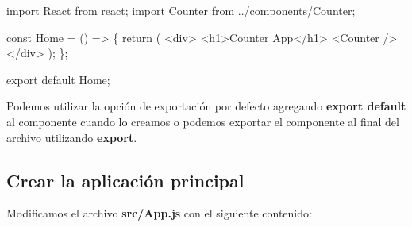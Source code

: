 \documentclass[
  a4paper,
  DIV=11,
  numbers=noendperiod,
  onepage,
  openany]{scrreprt}
\newenvironment{Shaded}{\begin{snugshade}}{\end{snugshade}}
\newcommand{\ControlFlowTok}[1]{\textcolor[rgb]{0.00,0.23,0.31}{#1}}
\newcommand{\FunctionTok}[1]{\textcolor[rgb]{0.28,0.35,0.67}{#1}}
\newcommand{\ImportTok}[1]{\textcolor[rgb]{0.00,0.46,0.62}{#1}}
\newcommand{\KeywordTok}[1]{\textcolor[rgb]{0.00,0.23,0.31}{#1}}
\newcommand{\NormalTok}[1]{\textcolor[rgb]{0.00,0.23,0.31}{#1}}
\newcommand{\OperatorTok}[1]{\textcolor[rgb]{0.37,0.37,0.37}{#1}}
\newcommand{\StringTok}[1]{\textcolor[rgb]{0.13,0.47,0.30}{#1}}
\begin{document}
\begin{Shaded}
\begin{Highlighting}[]
\ImportTok{import}\NormalTok{ React }\ImportTok{from} \StringTok{\textquotesingle{}react\textquotesingle{}}\OperatorTok{;}
\ImportTok{import}\NormalTok{ Counter }\ImportTok{from} \StringTok{\textquotesingle{}../components/Counter\textquotesingle{}}\OperatorTok{;}

\KeywordTok{const}\NormalTok{ Home }\OperatorTok{=}\NormalTok{ () }\KeywordTok{=\textgreater{}}\NormalTok{ \{}
  \ControlFlowTok{return}\NormalTok{ (}
    \KeywordTok{\textless{}div\textgreater{}}
      \KeywordTok{\textless{}h1\textgreater{}}\NormalTok{Counter App}\KeywordTok{\textless{}/h1\textgreater{}}
      \FunctionTok{\textless{}Counter} \FunctionTok{/\textgreater{}}
    \KeywordTok{\textless{}/div\textgreater{}}
\NormalTok{  )}\OperatorTok{;}
\NormalTok{\}}\OperatorTok{;}

\ImportTok{export} \ImportTok{default}\NormalTok{ Home}\OperatorTok{;}
\end{Highlighting}
\end{Shaded}

\begin{tcolorbox}[enhanced jigsaw, title=\textcolor{quarto-callout-tip-color}{\faLightbulb}\hspace{0.5em}{Tip}, colback=white, rightrule=.15mm, opacityback=0, colframe=quarto-callout-tip-color-frame, titlerule=0mm, opacitybacktitle=0.6, breakable, coltitle=black, colbacktitle=quarto-callout-tip-color!10!white, bottomtitle=1mm, toptitle=1mm, left=2mm, arc=.35mm, toprule=.15mm, leftrule=.75mm, bottomrule=.15mm]

Podemos utilizar la opción de exportación por defecto agregando
\textbf{export default} al componente cuando lo creamos o podemos
exportar el componente al final del archivo utilizando \textbf{export}.

\end{tcolorbox}

\subsection{Crear la aplicación
principal}\label{crear-la-aplicaciuxf3n-principal}

Modificamos el archivo \textbf{src/App.js} con el siguiente contenido:
\end{document}
